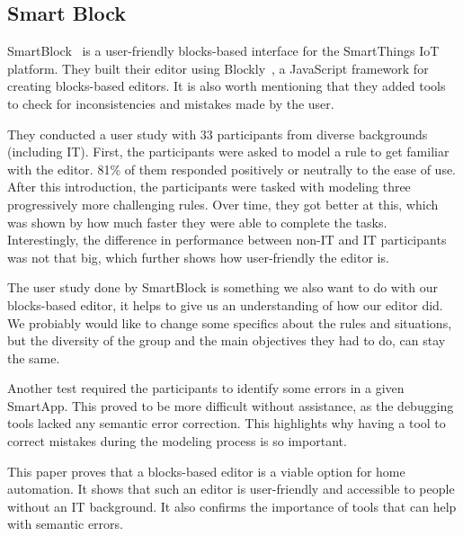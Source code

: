 \documentclass[11pt,a4paper]{report}
\begin{document}
\subsection{Smart Block}
\label{SmartBlock}
SmartBlock~\cite{SOTA_SmartBlock} is a user-friendly blocks-based interface for the SmartThings IoT platform. They built their editor using Blockly~\cite{Blockly}, a JavaScript framework for creating blocks-based editors. It is also worth mentioning that they added tools to check for inconsistencies and mistakes made by the user.

They conducted a user study with 33 participants from diverse backgrounds (including IT). First, the participants were asked to model a rule to get familiar with the editor. 81\% of them responded positively or neutrally to the ease of use. After this introduction, the participants were tasked with modeling three progressively more challenging rules. Over time, they got better at this, which was shown by how much faster they were able to complete the tasks. Interestingly, the difference in performance between non-IT and IT participants was not that big, which further shows how user-friendly the editor is.

The user study done by SmartBlock is something we also want to do with our blocks-based editor, it helps to give us an understanding of how our editor did. We probiably would like to change some specifics about the rules and situations, but the diversity of the group and the main objectives they had to do, can stay the same. 

Another test required the participants to identify some errors in a given SmartApp. This proved to be more difficult without assistance, as the debugging tools lacked any semantic error correction. This highlights why having a tool to correct mistakes during the modeling process is so important.

This paper proves that a blocks-based editor is a viable option for home automation. It shows that such an editor is user-friendly and accessible to people without an IT background. It also confirms the importance of tools that can help with semantic errors.
\end{document}
